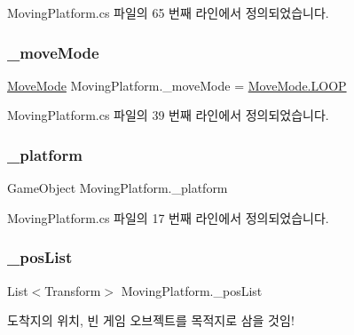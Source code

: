 Moving\+Platform.\+cs 파일의 65 번째 라인에서 정의되었습니다.

\mbox{\label{class_moving_platform_a47308284bdf720a8fe919a69f2c0019b}} 
\subsubsection{\texorpdfstring{\_moveMode}{\_moveMode}}
{\footnotesize\ttfamily \mbox{\hyperlink{class_moving_platform_a7b3427d2906069ecf4c39d69eee53653}{Move\+Mode}} Moving\+Platform.\+\_\+move\+Mode = \mbox{\hyperlink{class_moving_platform_a7b3427d2906069ecf4c39d69eee53653a9159b3578e4e1eb31ffdf90acd6f6e40}{Move\+Mode.\+L\+O\+OP}}}



Moving\+Platform.\+cs 파일의 39 번째 라인에서 정의되었습니다.

\mbox{\label{class_moving_platform_ac506246414b03f4f35d462f324c18ffc}} 
\subsubsection{\texorpdfstring{\_platform}{\_platform}}
{\footnotesize\ttfamily Game\+Object Moving\+Platform.\+\_\+platform\hspace{0.3cm}{\ttfamily [private]}}



Moving\+Platform.\+cs 파일의 17 번째 라인에서 정의되었습니다.

\mbox{\label{class_moving_platform_a51c0ce96c3fc6ad9350dc0350216835b}} 
\subsubsection{\texorpdfstring{\_posList}{\_posList}}
{\footnotesize\ttfamily List$<$Transform$>$ Moving\+Platform.\+\_\+pos\+List}



도착지의 위치, 빈 게임 오브젝트를 목적지로 삼을 것임! 



